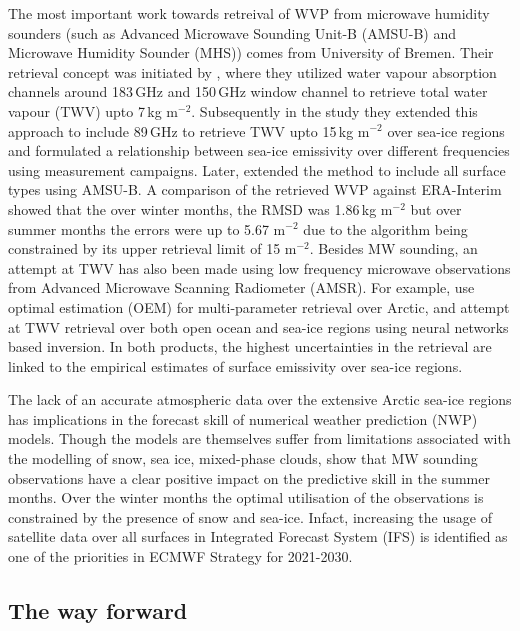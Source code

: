 \documentclass[12pt,oneside,a4paper]{article}
\begin{document}
The most important work towards retreival of WVP from microwave humidity
sounders (such as Advanced Microwave Sounding Unit-B (AMSU-B) and Microwave
Humidity Sounder (MHS)) comes from University of Bremen. Their retrieval
concept was initiated by \citet{miao:2001:atmos}, where they utilized water
vapour absorption channels around 183\,GHz and 150\,GHz window channel to
retrieve total water vapour (TWV) upto 7\,kg m$^{-2}$. Subsequently in the
study \citep{} they extended this approach to include 89\,GHz to retrieve TWV
upto 15\,kg m$^{-2}$ over sea-ice regions and formulated a relationship between
sea-ice emissivity over different frequencies using measurement campaigns.
Later, \cite{scarlat:2018:retri} extended the method to include all surface
types using AMSU-B. A comparison of the retrieved WVP against ERA-Interim
showed that the over winter months, the RMSD was 1.86\,kg m$^{-2}$ but over
summer months the errors were up to 5.67 m$^{-2}$ due to the algorithm being
constrained by its upper retrieval limit of 15 m$^{-2}$. Besides MW sounding,
an attempt at TWV has also been made using low frequency microwave observations
from Advanced Microwave Scanning Radiometer (AMSR). For example,
\citet{scarlat:2017:exper} use optimal estimation (OEM) for multi-parameter
retrieval over Arctic, and \citet{zabolotskikh:2020:anadv} attempt at TWV
retrieval over both open ocean and sea-ice regions using neural networks based
inversion. In both products, the highest uncertainties in the retrieval are
linked to the empirical estimates of surface emissivity over sea-ice regions.


The lack of an accurate atmospheric data over the extensive Arctic sea-ice regions has implications in the forecast skill of numerical weather prediction (NWP) models. Though the  models are themselves suffer from limitations associated with the modelling of snow, sea ice, mixed-phase clouds, \citet{lawrence:2019:usean} show that MW sounding observations have a clear positive impact on the predictive skill in the summer months. Over the winter months the optimal utilisation of the observations is constrained by the presence of snow and sea-ice. Infact,  increasing the usage of satellite data over all surfaces in Integrated Forecast System (IFS) is identified as one of the priorities in ECMWF Strategy for 2021-2030. 


\subsection{The way forward}
\end{document}
